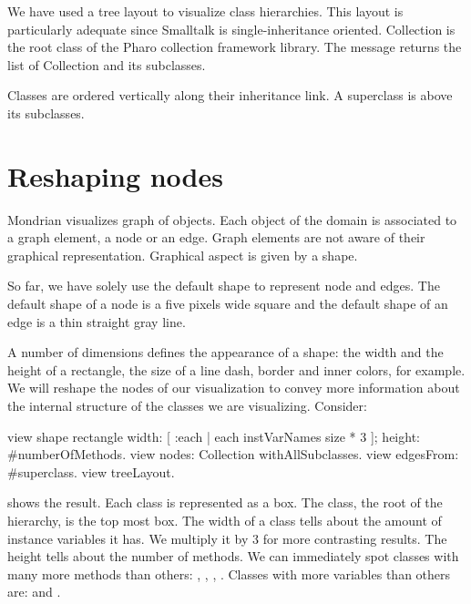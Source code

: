 \documentclass[a4paper,10pt,twoside]{book}
\begin{document}
We have used a tree layout to visualize class hierarchies. This layout is particularly adequate since Smalltalk is single-inheritance oriented. Collection is the root class of the Pharo collection framework library. The message  returns the list of Collection and its subclasses.

Classes are ordered vertically along their inheritance link. A superclass is above its subclasses. 


\section{Reshaping nodes}

Mondrian visualizes graph of objects. Each object of the domain is associated to a graph element, a node or an edge. Graph elements are not aware of their graphical representation. Graphical aspect is given by a shape. 

So far, we have solely use the default shape to represent node and edges. The default shape of a node is a five pixels wide square and the default shape of an edge is a thin straight gray line.

A number of dimensions defines the appearance of a shape: the width and the height of a rectangle, the size of a line dash, border and inner colors, for example. We will reshape the nodes of our visualization to convey more information about the internal structure of the classes we are visualizing. Consider:

\begin{code}{}
view shape rectangle
	width: [ :each | each instVarNames size * 3 ];
	height: #numberOfMethods.
view nodes: Collection withAllSubclasses.
view edgesFrom: #superclass.
view treeLayout.
\end{code}

 shows the result. Each class is represented as a box. The  class, the root of the hierarchy, is the top most box. The width of a class tells about the amount of instance variables it has. We multiply it by 3 for more contrasting results. The height tells about the number of methods. We can immediately spot classes with many more methods than others: , , , . Classes with more variables than others are:  and .
\end{document}
